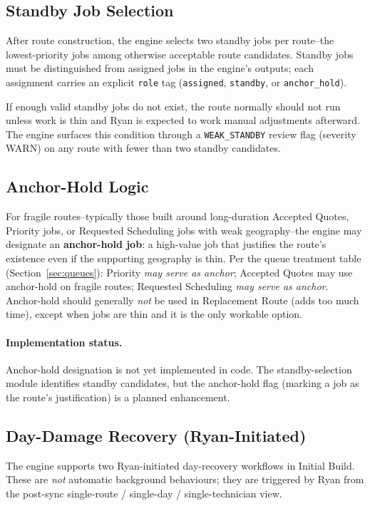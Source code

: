 \documentclass[12pt]{article}
\begin{document}
\subsection*{Standby Job Selection}

After route construction, the engine selects two standby jobs per route--the lowest-priority jobs among otherwise acceptable route candidates.
Standby jobs must be distinguished from assigned jobs in the engine's outputs; each assignment carries an explicit \texttt{role} tag (\texttt{assigned}, \texttt{standby}, or \texttt{anchor\_hold}).

If enough valid standby jobs do not exist, the route normally should not run unless work is thin and Ryan is expected to work manual adjustments afterward.
The engine surfaces this condition through a \texttt{WEAK\_STANDBY} review flag (severity WARN) on any route with fewer than two standby candidates.

\subsection*{Anchor-Hold Logic}

For fragile routes--typically those built around long-duration Accepted Quotes, Priority jobs, or Requested Scheduling jobs with weak geography--the engine may designate an \textbf{anchor-hold job}: a high-value job that justifies the route's existence even if the supporting geography is thin.
Per the queue treatment table (Section~\ref{sec:queues}): Priority \emph{may serve as anchor}; Accepted Quotes may use anchor-hold on fragile routes; Requested Scheduling \emph{may serve as anchor}.
Anchor-hold should generally \emph{not} be used in Replacement Route (adds too much time), except when jobs are thin and it is the only workable option.

\paragraph{Implementation status.}
Anchor-hold designation is not yet implemented in code.
The standby-selection module identifies standby candidates, but the anchor-hold flag (marking a job as the route's justification) is a planned enhancement.

\subsection*{Day-Damage Recovery (Ryan-Initiated)}

The engine supports two Ryan-initiated day-recovery workflows in Initial Build.
These are \emph{not} automatic background behaviours; they are triggered by Ryan from the post-sync single-route / single-day / single-technician view.
\end{document}

